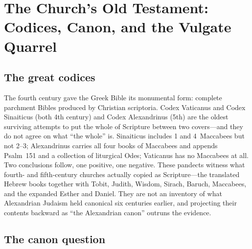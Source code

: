 \section{The Church's Old Testament: Codices, Canon, and the Vulgate Quarrel}

\subsection{The great codices}

The fourth century gave the Greek Bible its monumental form: complete
parchment Bibles produced by Christian scriptoria. Codex Vaticanus and
Codex Sinaiticus (both 4th century) and Codex Alexandrinus (5th) are the
oldest surviving attempts to put the whole of Scripture between two
covers---and they do not agree on what ``the whole'' is. Sinaiticus
includes 1 and 4~Maccabees but not 2--3; Alexandrinus carries all four
books of Maccabees and appends Psalm~151 and a collection of liturgical
Odes; Vaticanus has no Maccabees at all. Two conclusions follow, one positive, one negative. These
pandects witness what fourth- and fifth-century churches actually copied
as Scripture---the translated Hebrew books together with Tobit, Judith,
Wisdom, Sirach, Baruch, Maccabees, and the expanded Esther and Daniel.
They are not an inventory of what Alexandrian Judaism held canonical six
centuries earlier, and projecting their contents backward as ``the
Alexandrian canon'' outruns the evidence.

\subsection{The canon question}

